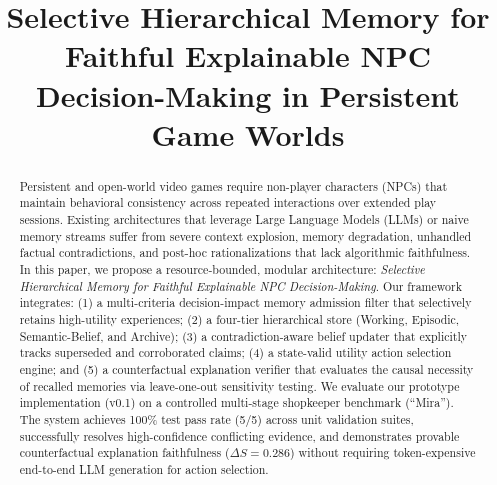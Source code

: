 \documentclass[conference]{IEEEtran}
\begin{document}
\title{Selective Hierarchical Memory for Faithful Explainable NPC Decision-Making in Persistent Game Worlds}

\author{
\and
{}
}

\maketitle

\begin{abstract}
Persistent and open-world video games require non-player characters (NPCs) that maintain behavioral consistency across repeated interactions over extended play sessions. Existing architectures that leverage Large Language Models (LLMs) or naive memory streams suffer from severe context explosion, memory degradation, unhandled factual contradictions, and post-hoc rationalizations that lack algorithmic faithfulness. In this paper, we propose a resource-bounded, modular architecture: \textit{Selective Hierarchical Memory for Faithful Explainable NPC Decision-Making}. Our framework integrates: (1) a multi-criteria decision-impact memory admission filter that selectively retains high-utility experiences; (2) a four-tier hierarchical store (Working, Episodic, Semantic-Belief, and Archive); (3) a contradiction-aware belief updater that explicitly tracks superseded and corroborated claims; (4) a state-valid utility action selection engine; and (5) a counterfactual explanation verifier that evaluates the causal necessity of recalled memories via leave-one-out sensitivity testing. We evaluate our prototype implementation (v0.1) on a controlled multi-stage shopkeeper benchmark (``Mira''). The system achieves 100\% test pass rate (5/5) across unit validation suites, successfully resolves high-confidence conflicting evidence, and demonstrates provable counterfactual explanation faithfulness ($\Delta S = 0.286$) without requiring token-expensive end-to-end LLM generation for action selection.
\end{abstract}
\end{document}
